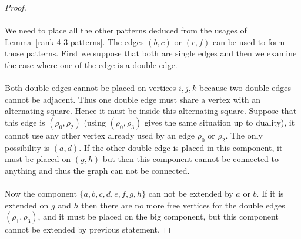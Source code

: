 \begin{proof}
\begin{figure}[H]
\begin{center}
      \caption{}
    \end{center}
  \end{figure}

  \paragraph{}
  We need to place all the other patterns deduced from the usages of Lemma~\ref{rank-4-3-patterns}. The edges $(b,c)$ or $(c,f)$ can be used to form those patterns. First we suppose that both are single edges and then we examine the case where one of the edge is a double edge.

  \paragraph{}
  Both double edges cannot be placed on vertices $i,j,k$ because two double edges cannot be adjacent. Thus one double edge must share a vertex with an alternating square. Hence it must be inside this alternating square. Suppose that this edge is $(\rho_0, \rho_2)$ (using $(\rho_0, \rho_3)$ gives the same situation up to duality), it cannot use any other vertex already used by an edge $\rho_0$ or $\rho_2$. The only possibility is $(a,d)$. If the other double edge is placed in this component, it must be placed on $(g,h)$ but then this component cannot be connected to anything and thus the graph can not be connected.

  \paragraph{}
  Now the component $\{a,b,c,d,e,f,g,h\}$ can not be extended by $a$ or $b$. If it is extended on $g$ and $h$ then there are no more free vertices for the double edges $(\rho_1, \rho_3)$, and it must be placed on the big component, but this component cannot be extended by previous statement.


\end{proof}
